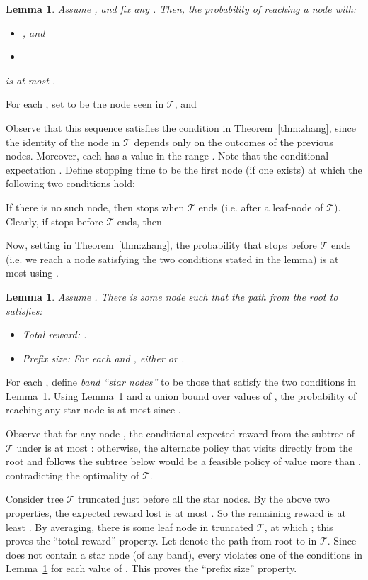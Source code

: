 \documentclass[11pt,letterpaper]{article}
\newtheorem{lemma}[theorem]{Lemma}
\numberwithin{algorithm}{section}
\newenvironment{proof}{

\noindent{\bf Proof:}}
{\hfill


}
\newcommand{\T}{\ensuremath{\mathcal{T}}\xspace}
\begin{document}
\begin{lemma}\label{lem:corr-prob}
Assume , and fix any . Then, the probability of reaching a node  with:\begin{itemize}
\item , and
\item 
\end{itemize}
is at most .
\end{lemma}
\begin{proof}
For each , set  to be the  node seen in \T, and

Observe that this sequence satisfies the condition in Theorem~\ref{thm:zhang}, since the identity of the  node in \T depends only on the outcomes of the previous  nodes. Moreover, each  has a value in the range . Note that the conditional expectation . Define stopping time  to be the first node  (if one exists) at which the following two conditions hold:


If there is no such node, then  stops when \T ends (i.e. after a leaf-node of \T). Clearly, if  stops before \T ends, then


Now, setting  in Theorem~\ref{thm:zhang}, the probability that  stops before \T ends (i.e. we reach a node  satisfying the two conditions stated in the lemma) is at most    using . \end{proof}


\begin{lemma}\label{lem:corr-NAfromA}
Assume . There is some node  such that the path  from the root to  satisfies:
\begin{itemize}
\item Total reward: .
\item Prefix size: For each  and , either  or .
\end{itemize}
\end{lemma}
\begin{proof}
For each , define {\em band  ``star nodes''} to be those  that satisfy the two conditions in Lemma~\ref{lem:corr-prob}. Using Lemma~\ref{lem:corr-prob} and a union bound over  values of , the probability  of reaching any star node is at most  since .

Observe that for any node , the conditional expected reward from the subtree of \T under  is at most : otherwise, the alternate policy that visits  directly from the root and follows the subtree below  would be a feasible policy of value more than , contradicting the optimality of \T.

Consider tree \T truncated just before all the star nodes. By the above two properties, the expected reward lost is at most . So the remaining reward is at least . By averaging, there is some leaf node  in truncated \T, at which ; this proves the ``total reward'' property. Let  denote the path from root to  in \T. Since  does not contain a star node (of any band), every   violates one of the conditions in Lemma~\ref{lem:corr-prob} for each value of . This proves the ``prefix size'' property.
\end{proof}
\end{document}
